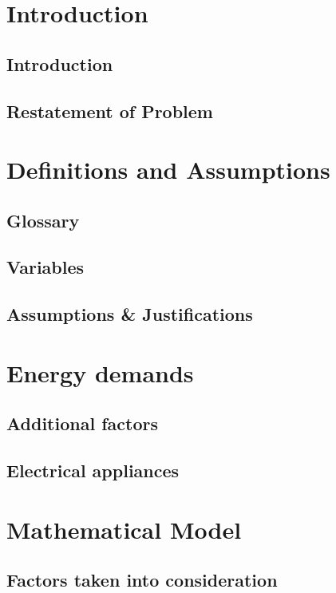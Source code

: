 \documentclass[12pt]{article}
\begin{document}


\tableofcontents
\newpage

\section{Introduction}
\subsection{Introduction}

\subsection{Restatement of Problem}


\section{Definitions and Assumptions}
\subsection{Glossary}

\subsection{Variables}

\subsection{Assumptions \& Justifications}


\section{Energy demands}
\subsection{Additional factors}

\subsection{Electrical appliances}


\newpage
\section{Mathematical Model}
\subsection{Factors taken into consideration}

\end{document}
